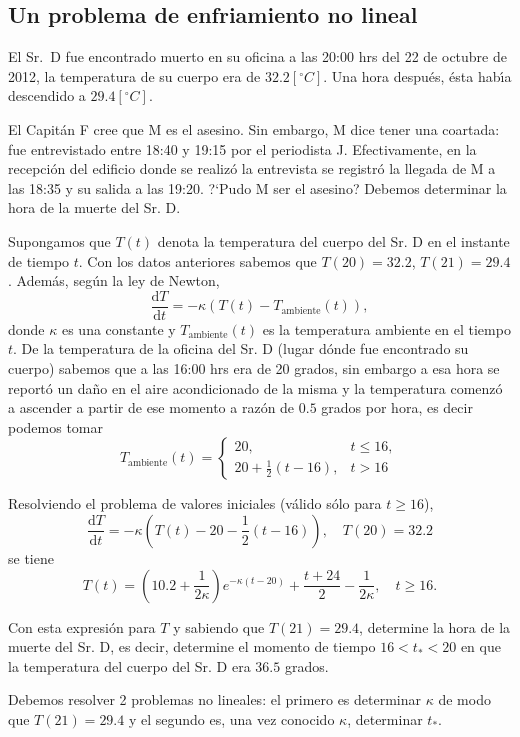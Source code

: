 \documentclass[letter,11pt]{article}
\newcommand\0{\mathbf{0}}
\begin{document}
\subsection{Un problema de enfriamiento no lineal}
El Sr.\ D fue encontrado muerto en su oficina a las 20:00 hrs del 22 de octubre de 2012, la
		temperatura de su cuerpo era de $32.2[^\circ C]$. Una hora despu\'es,
		\'esta hab\'{\i}a descendido a $29.4[^\circ C]$.

		El Capit\'an F cree que M es el asesino. Sin embargo, M dice
		tener una coartada: fue entrevistado entre 18:40 y 19:15 por el periodista J. Efectivamente, en la recepci\'on
		del edificio donde se realiz\'o la entrevista se registr\'o la llegada de M a las 18:35 y su salida
		a las 19:20. ?`Pudo M ser el asesino? Debemos determinar la hora de la muerte del Sr. D.

		Supongamos que $T(t)$ denota la temperatura del cuerpo del Sr. D en el instante de tiempo $t$.
		Con los datos anteriores sabemos que
		$T(20) = 32.2$, $T(21) = 29.4$. Adem\'as, seg\'un la ley de Newton,
		\[
			\frac{\mbox{d}T}{\mbox{d}t} = -\kappa\left(T(t) - T_{\mbox{ambiente}}(t)\right),
		\]
		donde $\kappa$ es una constante y $T_{\mbox{ambiente}}(t)$ es la temperatura ambiente en el tiempo $t$.
		De la temperatura de la oficina del Sr. D (lugar d\'onde fue encontrado su cuerpo) sabemos que
		a las 16:00 hrs era de 20 grados, sin embargo a esa hora se report\'o un da\~no
		en el aire acondicionado de la misma y la temperatura comenz\'o a ascender
		a partir de ese momento a raz\'on de $0.5$ grados por hora, es decir
		podemos tomar
		\[
			T_{\mbox{ambiente}}(t) = \begin{cases}
										20, & t \le 16,\\
										20 + \frac 1 2 (t-16), & t > 16
			                      \end{cases}
		\]

		Resolviendo el problema de valores iniciales (v\'alido s\'olo para $t \ge 16$),
		\[
			\frac{\mbox{d}T}{\mbox{d}t} = -\kappa\left(T(t) - 20 - \frac 1 2(t-16)\right),\quad T(20) = 32.2
		\]
		se tiene
		\[
			T(t) = \left(10.2 + \frac{1}{2\kappa}\right)e^{-\kappa(t-20)} + \frac{t + 24}{2} - \frac{1}{2\kappa},\quad t \ge 16.
		\]

		Con esta expresi\'on para $T$ y sabiendo que $T(21) = 29.4$, determine la hora de la muerte del Sr. D, es decir,
		determine el momento de tiempo $16 < t_* < 20$ en que la temperatura
		del cuerpo del Sr. D era $36.5$ grados.		

		Debemos resolver 2 problemas no lineales: el primero es determinar $\kappa$ de modo que $T(21) = 29.4$ y el segundo es,
		una vez conocido $\kappa$, determinar $t_*$.
\end{document}
